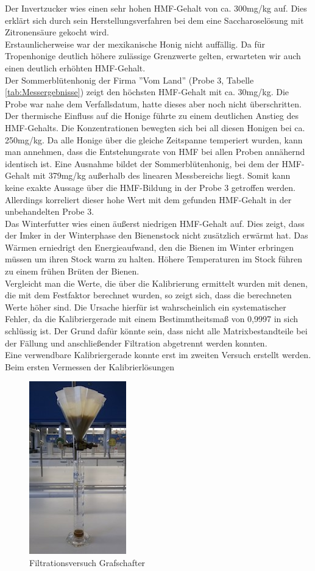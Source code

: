 Der Invertzucker wies einen sehr hohen HMF-Gehalt von ca. 300mg/kg auf. Dies erklärt sich durch sein Herstellungsverfahren bei dem eine Saccharoselösung mit Zitronensäure gekocht wird.\\
Erstaunlicherweise war der mexikanische Honig nicht auffällig. Da für Tropenhonige deutlich höhere zulässige Grenzwerte gelten, erwarteten wir auch einen deutlich erhöhten HMF-Gehalt. \\
Der Sommerblütenhonig der Firma ''Vom Land'' (Probe 3, Tabelle \ref{tab:Messergebnisse}) zeigt den höchsten HMF-Gehalt mit ca. 30mg/kg. Die Probe war nahe dem Verfallsdatum, hatte dieses aber noch nicht überschritten.\\
Der thermische Einfluss auf die Honige führte zu einem deutlichen Anstieg des HMF-Gehalts. Die Konzentrationen bewegten sich bei all diesen Honigen bei ca. 250mg/kg. Da alle Honige über die gleiche Zeitspanne temperiert wurden, kann man annehmen, dass die Entstehungsrate von HMF bei allen Proben annähernd identisch ist. Eine Ausnahme bildet der Sommerblütenhonig, bei dem der HMF-Gehalt mit 379mg/kg außerhalb des linearen Messbereichs liegt. Somit kann keine exakte Aussage über die HMF-Bildung in der Probe 3 getroffen werden. Allerdings korreliert dieser hohe Wert mit dem gefunden HMF-Gehalt in der unbehandelten Probe 3.\\
Das Winterfutter wies einen äußerst niedrigen HMF-Gehalt auf. Dies zeigt, dass der Imker in der Winterphase den Bienenstock nicht zusätzlich erwärmt hat. Das Wärmen erniedrigt den Energieaufwand, den die Bienen im Winter erbringen müssen um ihren Stock warm zu halten. Höhere Temperaturen im Stock führen zu einem frühen Brüten der Bienen.~\cite{Imkern}\\
Vergleicht man die Werte, die über die Kalibrierung ermittelt wurden mit denen, die mit dem Festfaktor berechnet wurden, so zeigt sich, dass die berechneten Werte höher sind. Die Ursache hierfür ist wahrscheinlich ein systematischer Fehler, da die Kalibriergerade mit einem Bestimmtheitsmaß von 0,9997 in sich schlüssig ist. Der Grund dafür könnte sein, dass nicht alle Matrixbestandteile bei der Fällung und anschließender Filtration abgetrennt werden konnten.\\
Eine verwendbare Kalibriergerade konnte erst im zweiten Versuch erstellt werden. Beim ersten Vermessen der Kalibrierlösungen 
\begin{figure}[hbp]
  \centering
  \includegraphics{../Bilder/20150427_153416.jpg}
  \caption{Filtrationsversuch Grafschafter}
  \label{fig:Grafschafter}
\end{figure}
